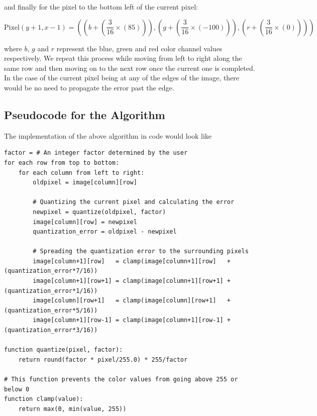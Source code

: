 \documentclass{article}
\begin{document}
\noindent and finally for the pixel to the bottom left of the current pixel:

$$
    \text{Pixel}(y+1,x-1) = \left(\left(b+\left(\frac{3}{16}\times(85)\right)\right),\left(g+\left(\frac{3}{16}\times(-100)\right)\right),\left(r+\left(\frac{3}{16}\times(0)\right)\right)\right)
$$

\noindent where $b$, $g$ and $r$ represent the blue, green and red color channel values respectively. We repeat this process while moving from left to right along the same row and then moving on to the next row once the current one is completed. In the case of the current pixel being at any of the edges of the image, there would be no need to propagate the error past the edge.

\subsection{Pseudocode for the Algorithm}\label{Floyd-Steinberg Pseudocode}

The implementation\cite{coding-train} of the above algorithm in code would look like

\begin{verbatim}
factor = # An integer factor determined by the user
for each row from top to bottom:
    for each column from left to right:
        oldpixel = image[column][row]

        # Quantizing the current pixel and calculating the error
        newpixel = quantize(oldpixel, factor)
        image[column][row] = newpixel
        quantization_error = oldpixel - newpixel

        # Spreading the quantization error to the surrounding pixels
        image[column+1][row]   = clamp(image[column+1][row]   + (quantization_error*7/16))
        image[column+1][row+1] = clamp(image[column+1][row+1] + (quantization_error*1/16))
        image[column][row+1]   = clamp(image[column][row+1]   + (quantization_error*5/16))
        image[column+1][row-1] = clamp(image[column+1][row-1] + (quantization_error*3/16))

function quantize(pixel, factor):
    return round(factor * pixel/255.0) * 255/factor

# This function prevents the color values from going above 255 or below 0
function clamp(value):
    return max(0, min(value, 255))
\end{verbatim}
\end{document}

